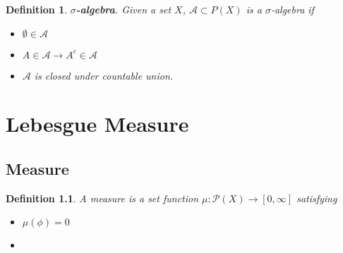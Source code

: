 \documentclass{book}
\newtheorem{definition}{Definition}
\begin{document}
\begin{CJK}{UTF8}{gbsn}
\begin{definition}
	\textbf{$\sigma$-algebra}. Given a set $X$, $\mathcal{A}\subset P(X)$ is a $\sigma$-algebra if \par 
\begin{itemize}
	\item $\emptyset\in \mathcal{A}$
	\item $A\in \mathcal{A}\rightarrow A^c \in \mathcal{A}$
	\item $\mathcal{A}$ is closed under countable union.
\end{itemize}
\end{definition}



\chapter{Lebesgue Measure}
\section{Measure}
\begin{definition}
	A measure is a set function $\mu: \mathcal{P}(X)\rightarrow [0,\infty]$ satisfying
	\begin{itemize}
		\item $\mu(\phi)=0$
		\item 
	\end{itemize}
\end{definition}



\end{CJK}
\end{document}
